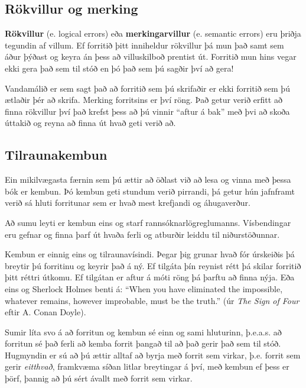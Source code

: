 \subsection{Rökvillur og merking}

{\bf Rökvillur} (e. logical errors) eða {\bf merkingarvillur} (e. semantic errors) eru þriðja tegundin af villum.
Ef forritið þitt inniheldur rökvillur þá mun það samt sem áður þýðast og keyra án þess að villuskilboð prentist út.
Forritið mun hins vegar ekki gera það sem til stóð en þó það sem þú sagðir því að gera!

Vandamálið er sem sagt það að forritið sem þú skrifaðir er ekki forritið sem þú ætlaðir þér að skrifa.
Merking forritsins er því röng.
Það getur verið erfitt að finna rökvillur því það krefst þess að þú vinnir ``aftur á bak'' með þvi að skoða úttakið og reyna að finna út hvað geti verið að.

\subsection{Tilraunakembun}

Ein mikilvægasta færnin sem þú ættir að öðlast við að lesa og vinna með þessa bók er kembun.
Þó kembun geti stundum verið pirrandi, þá getur hún jafnframt verið sá hluti forritunar sem er hvað mest krefjandi og áhugaverður.

Að sumu leyti er kembun eins og starf rannsóknarlögreglumanns.
Vísbendingar eru gefnar og finna þarf út hvaða ferli og atburðir leiddu til niðurstöðunnar. 

Kembun er einnig eins og tilraunavísindi.
Þegar þig grunar hvað fór úrskeiðis þá breytir þú forritinu og keyrir það á ný.
Ef tilgáta þín reynist rétt þá skilar forritið þitt réttri útkomu.
Ef tilgátan er aftur á móti röng þá þarftu að finna nýja.
Eða eins og Sherlock Holmes benti á: ``When you have eliminated the
impossible, whatever remains, however improbable, must be the truth.''
(úr {\em The Sign of Four} eftir A. Conan Doyle).


Sumir líta svo á að forritun og kembun sé einn og sami hluturinn, þ.e.a.s. að forritun sé það ferli að kemba forrit þangað til að það gerir það sem til stóð.
Hugmyndin er sú að þú ættir alltaf að byrja með forrit sem virkar, þ.e. forrit sem gerir {\em eitthvað}, framkvæma síðan litlar breytingar á því, með kembun ef þess er þörf, þannig að þú sért ávallt með forrit sem virkar.

